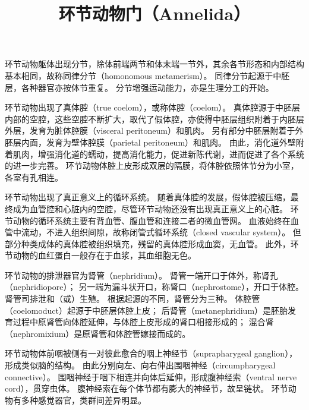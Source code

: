 \documentclass[11pt]{article}
\title{环节动物门（Annelida）}
\date{}
\begin{document}
  \maketitle

  \linenumbers
环节动物躯体出现分节，除体前端两节和体末端一节外，其余各节形态和内部结构基本相同，故称同律分节（homonomous metamerism）。
同律分节起源于中胚层，各种器官亦按体节重复。
分节增强运动能力，亦是生理分工的开始。

\newline

环节动物出现了真体腔（true coelom），或称体腔（coelom）。
真体腔源于中胚层内部的空腔，这些空腔不断扩大，取代了假体腔，亦使得中胚层组织附着于内胚层外层，发育为脏体腔膜（visceral peritoneum）和肌肉。
另有部分中胚层附着于外胚层内面，发育为壁体腔膜（parietal peritoneum）和肌肉。
由此，消化道外壁附着肌肉，增强消化道的蠕动，提高消化能力，促进新陈代谢，进而促进了各个系统的进一步完善。
环节动物体腔上皮形成双层的隔膜，将体腔依照体节分为小室，各室有孔相连。

\newline

环节动物出现了真正意义上的循环系统。
随着真体腔的发展，假体腔被压缩，最终成为血管腔和心脏内的空腔，尽管环节动物还没有出现真正意义上的心脏。
环节动物的循环系统主要有背血管、腹血管和连接二者的微血管网。
血液始终在血管中流动，不进入组织间隙，故称闭管式循环系统（closed vascular system）。
但部分种类成体的真体腔被组织填充，残留的真体腔形成血窦，无血管。
此外，环节动物的血红蛋白一般存在于血浆，其血细胞无色。

\newline

环节动物的排泄器官为肾管（nephridium）。
肾管一端开口于体外，称肾孔（nephridiopore）；
另一端为漏斗状开口，称肾口（nephrostome），开口于体腔。
肾管司排泄和（或）生殖。
根据起源的不同，肾管分为三种。
体腔管（coelomoduct）起源于中胚层体腔上皮；
后肾管（metanephridium）是胚胎发育过程中原肾管向体腔延伸，与体腔上皮形成的肾口相接形成的；
混合肾（nephromixium）是原肾管和体腔管嫁接而成的。

\newline

环节动物体前咽被侧有一对彼此愈合的咽上神经节（suprapharygeal ganglion），形成类似脑的结构。
由此分别向左、向右伸出围咽神经（circumpharygeal connective）。
围咽神经于咽下相连并向体后延伸，形成腹神经索（ventral nerve cord），贯穿虫体。
腹神经索在每个体节都有膨大的神经节，故呈链状。
环节动物有多种感觉器官，类群间差异明显。

\newline
\end{document}

